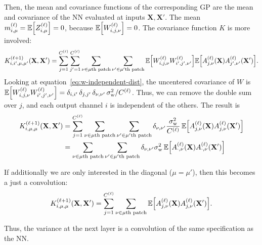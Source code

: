 \documentclass{article}
\theoremstyle{definition}
\newcommand{\vX}{\mathbf{X}}
\newcommand{\patchfun}[1]{{#1}\text{th patch}}
\newcommand{\bracket}[3]{{\left#1 #3 \right#2}}
\newcommand{\bra}{\bracket{(}{)}}
\newcommand{\sqb}{\bracket{[}{]}}
\newcommand{\ssup}[1]{^{\bra{#1}}}
\begin{document}
Then, the mean and covariance functions of the corresponding GP are the mean and covariance of the NN evaluated at inputs $\vX, \vX'$. The mean $m\ssup{\ell}_{i,\mu} = \ExpSymb\sqb{Z\ssup{\ell}_{i,\mu}} = 0$, because $\ExpSymb\sqb{W\ssup{\ell}_{i,j,\nu}}=0$. The covariance function $K$ is more involved:
\begin{equation}
    K\ssup{\ell+1}_{i,i',\mu,\mu'}(\vX, \vX') %
    = \sum_{j=1}^{C\ssup{\ell}} \sum_{j'=1}^{C\ssup{\ell}} \sum_{\nu \in \patchfun{\mu}} \sum_{\nu' \in \patchfun{\mu'}} \ExpSymb\sqb{
    W\ssup{\ell}_{i,j,\nu} W\ssup{\ell}_{i',j',\nu'}} \ExpSymb\sqb{A\ssup{\ell}_{j,\nu}(\vX) A\ssup{\ell}_{j',\nu'}(\vX')}.
  \label{eq:cov-independent}
\end{equation}
Looking at equation~\cref{eq:w-independent-dist}, the uncentered covariance of $W$ is $\ExpSymb\sqb{W\ssup{\ell}_{i,j,\nu}W\ssup{\ell}_{i',j',\nu'}} = \delta_{i,i'} \, \delta_{j, j'} \, \delta_{\nu, \nu'}\, \sigma_\text{w}^2/C\ssup{\ell}$. Thus, we can remove the double sum over $j$, and each output channel $i$ is independent of the others. The result is 
\begin{align}
    K\ssup{\ell+1}_{i,\mu,\mu}(\vX, \vX') %
    &= \sum_{j=1}^{C\ssup{\ell}} \sum_{\nu \in \patchfun{\mu}} \sum_{\nu' \in \patchfun{\mu'}} \delta_{\nu,\nu'} \frac{\sigma^2_\text{w}}{C\ssup{\ell}}\,
    \ExpSymb\sqb{A\ssup{\ell}_{j,\nu}(\vX) A\ssup{\ell}_{j,\nu}(\vX')} \\
    &= \sum_{\nu \in \patchfun{\mu}} \sum_{\nu' \in \patchfun{\mu'}} \delta_{\nu,\nu'} \sigma^2_\text{w}\,
      \ExpSymb\sqb{A\ssup{\ell}_{\cdot,\nu}(\vX) A\ssup{\ell}_{\cdot,\nu}(\vX')} 
\end{align}

If additionally we are only interested in the diagonal ($\mu=\mu'$), then this
becomes a just a convolution:
\begin{equation*}
    K\ssup{\ell+1}_{i,\mu,\mu}(\vX, \vX') %
    = \sum_{j=1}^{C\ssup{\ell}} \sum_{\nu \in \patchfun{\mu}}  \ExpSymb\sqb{A\ssup{\ell}_{j,\nu}(\vX) A\ssup{\ell}_{j,\nu}(\vX')}.
\end{equation*}

Thus, the variance at the next layer is a convolution of the same specification as the NN.
\end{document}
